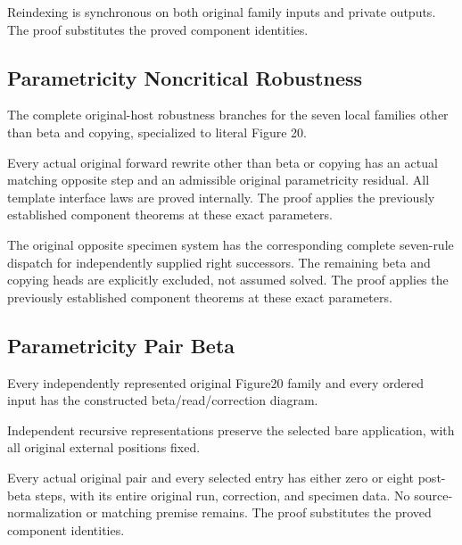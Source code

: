 Reindexing is synchronous on both original family inputs and private outputs.
The proof substitutes the proved component identities.
\par{}

\subsection{Parametricity Noncritical Robustness}
The complete original-host robustness branches for the seven local
families other than beta and copying, specialized to literal Figure 20.

Every actual original forward rewrite other than beta or copying has
an actual matching opposite step and an admissible original parametricity
residual. All template interface laws are proved internally.
The proof applies the previously established component theorems at these exact parameters.
\par{}

The original opposite specimen system has the corresponding complete
seven-rule dispatch for independently supplied right successors. The
remaining beta and copying heads are explicitly excluded, not assumed solved.
The proof applies the previously established component theorems at these exact parameters.
\par{}

\subsection{Parametricity Pair Beta}
Every independently represented original Figure20 family and every
ordered input has the constructed beta/read/correction diagram.

Independent recursive representations preserve the selected bare
application, with all original external positions fixed.
\par{}

Every actual original pair and every selected entry has either zero or
eight post-beta steps, with its entire original run, correction, and specimen
data. No source-normalization or matching premise remains.
The proof substitutes the proved component identities.
\par{}

